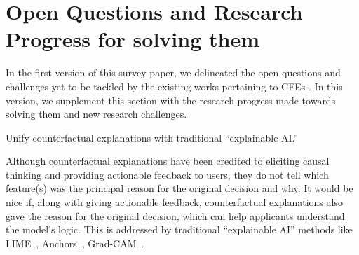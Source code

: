 \section{Open Questions and Research Progress for solving them}

In the first version of this survey paper, we delineated the open questions and challenges yet to be tackled by the existing works pertaining to CFEs \citep{cfe-challenges-paper}. In this version, we supplement this section with the research progress made towards solving them and new research challenges. 

\begin{challenge}\label{ch:unification}
Unify counterfactual explanations with traditional ``explainable AI.''
\end{challenge}
Although counterfactual explanations have been credited to eliciting causal thinking and providing actionable feedback to users, they do not tell which feature(s) was the principal reason for the original decision and why. It would be nice if, along with giving actionable feedback, counterfactual explanations also gave the reason for the original decision, which can help applicants understand the model's logic. This is addressed by traditional ``explainable AI'' methods like LIME~\citep{ribeiro_why_2016}, Anchors~\citep{Ribeiro2018Anchors}, Grad-CAM~\citep{grad-cam}. 

